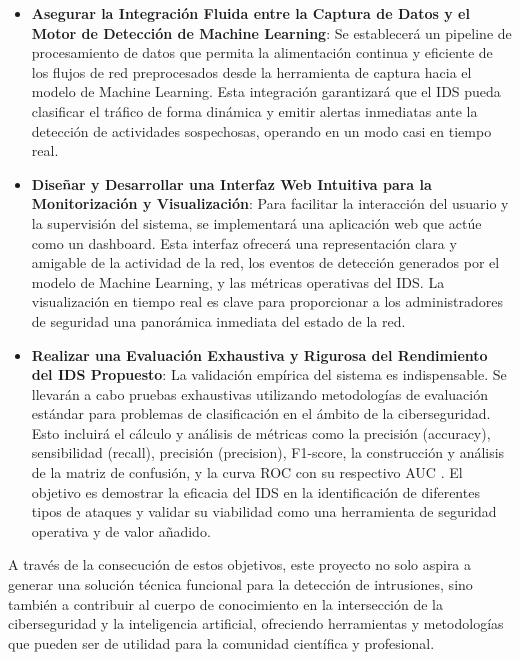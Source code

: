 \begin{itemize}
    \item\textbf{Asegurar la Integración Fluida entre la Captura de Datos y el Motor de Detección de Machine Learning}: Se establecerá un pipeline de procesamiento de datos que permita la alimentación continua y eficiente de los flujos de red preprocesados desde la herramienta de captura hacia el modelo de Machine Learning. Esta integración garantizará que el IDS pueda clasificar el tráfico de forma dinámica y emitir alertas inmediatas ante la detección de actividades sospechosas, operando en un modo casi en tiempo real.
    
    \item\textbf{Diseñar y Desarrollar una Interfaz Web Intuitiva para la Monitorización y Visualización}: Para facilitar la interacción del usuario y la supervisión del sistema, se implementará una aplicación web que actúe como un dashboard. Esta interfaz ofrecerá una representación clara y amigable de la actividad de la red, los eventos de detección generados por el modelo de Machine Learning, y las métricas operativas del IDS. La visualización en tiempo real es clave para proporcionar a los administradores de seguridad una panorámica inmediata del estado de la red.
    
    \item\textbf{Realizar una Evaluación Exhaustiva y Rigurosa del Rendimiento del IDS Propuesto}: La validación empírica del sistema es indispensable. Se llevarán a cabo pruebas exhaustivas utilizando metodologías de evaluación estándar para problemas de clasificación en el ámbito de la ciberseguridad. Esto incluirá el cálculo y análisis de métricas como la precisión (accuracy), sensibilidad (recall), precisión (precision), F1-score, la construcción y análisis de la matriz de confusión, y la curva ROC con su respectivo AUC \cite{PolaniaArias2021EvaluacionMLIDS}. El objetivo es demostrar la eficacia del IDS en la identificación de diferentes tipos de ataques y validar su viabilidad como una herramienta de seguridad operativa y de valor añadido.
 
\end{itemize}

A través de la consecución de estos objetivos, este proyecto no solo aspira a generar una solución técnica funcional para la detección de intrusiones, sino también a contribuir al cuerpo de conocimiento en la intersección de la ciberseguridad y la inteligencia artificial, ofreciendo herramientas y metodologías que pueden ser de utilidad para la comunidad científica y profesional.

